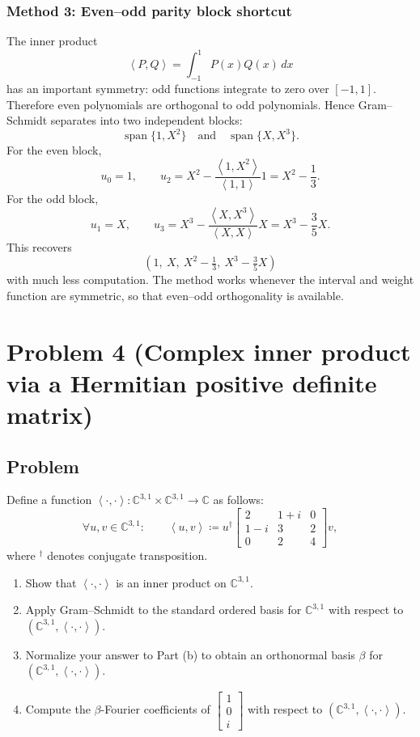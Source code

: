 \documentclass[12pt]{article}
\newcommand{\df}{\coloneqq}
\newcommand{\C}{\mathbb{C}}
\DeclareMathOperator{\Span}{span}
\newcommand{\ip}[2]{\left\langle #1,#2\right\rangle}
\begin{document}
\newpage
\subsubsection{Method 3: Even--odd parity block shortcut}
The inner product
\[
\ip{P}{Q}=\int_{-1}^{1}P(x)Q(x)\,dx
\]
has an important symmetry: odd functions integrate to zero over $[-1,1]$.
Therefore even polynomials are orthogonal to odd polynomials. Hence Gram--Schmidt separates into two independent blocks:
\[
\Span\{1,X^2\}\quad\text{and}\quad \Span\{X,X^3\}.
\]
For the even block,
\[
u_0=1,
\qquad
u_2=X^2-\frac{\ip{1}{X^2}}{\ip{1}{1}}1
=X^2-\frac13.
\]
For the odd block,
\[
u_1=X,
\qquad
u_3=X^3-\frac{\ip{X}{X^3}}{\ip{X}{X}}X
=X^3-\frac{3}{5}X.
\]
This recovers
\[
\boxed{\,(1,\ X,\ X^2-\tfrac13,\ X^3-\tfrac35X)\,}
\]
with much less computation. The method works whenever the interval and weight function are symmetric, so that even--odd orthogonality is available.


\newpage
\section{Problem 4 (Complex inner product via a Hermitian positive definite matrix)}
\subsection{Problem}
Define a function $\ip{\cdot}{\cdot}:\C^{3,1}\times \C^{3,1}\to \C$ as follows:
\[
\forall u,v\in \C^{3,1}:\qquad
\ip{u}{v}\df u^{\dagger}
\begin{bmatrix}
2 & 1+i & 0\\
1-i & 3 & 2\\
0 & 2 & 4
\end{bmatrix}
v,
\]
where ${}^\dagger$ denotes conjugate transposition.
\begin{enumerate}[label=(\alph*)]
\item Show that $\ip{\cdot}{\cdot}$ is an inner product on $\C^{3,1}$.
\item Apply Gram--Schmidt to the standard ordered basis for $\C^{3,1}$ with respect to $(\C^{3,1},\ip{\cdot}{\cdot})$.
\item Normalize your answer to Part (b) to obtain an orthonormal basis $\beta$ for $(\C^{3,1},\ip{\cdot}{\cdot})$.
\item Compute the $\beta$-Fourier coefficients of $\begin{bmatrix}1\\0\\ i\end{bmatrix}$ with respect to $(\C^{3,1},\ip{\cdot}{\cdot})$.
\end{enumerate}
\end{document}
